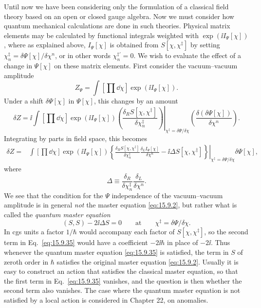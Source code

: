Until now we have been considering only the formulation of a classical field
theory based on an open or closed gauge algebra. Now we must consider how
quantum mechanical calculations are done in such theories. Physical matrix
elements may be calculated by functional integrals weighted with
$\exp(\ii I_\Psi[\chi])$, where as explained above, $I_\Psi[\chi]$ is obtained
from $S[\chi,\chi^{\ddagger}]$ by setting
$\chi_n^{\ddagger}=\delta\Psi[\chi]/\delta\chi^n$, or in other words
$\chi_n^{\ddagger\prime}=0$. We wish to evaluate the effect of a change in
$\Psi[\chi]$ on these matrix elements. First consider the vacuum--vacuum
amplitude
\begin{equation}
Z_\Psi=\int\left[\prod \dd\chi\right]\exp(\ii I_\Psi[\chi]).
\tag{15.9.31}\label{eq:15.9.31}
\end{equation}
Under a shift $\delta\Psi[\chi]$ in $\Psi[\chi]$, this changes by an amount
\begin{equation}
\delta Z=\ii\int\left[\prod \dd\chi\right]\exp(\ii I_\Psi[\chi])
\left.
\left(\frac{\delta_R S[\chi,\chi^{\ddagger}]}
{\delta\chi_n^{\ddagger}}\right)
\right|_{\chi^{\ddagger}=\delta\Psi/\delta\chi}
\left(\frac{\delta(\delta\Psi[\chi])}{\delta\chi^n}\right).
\tag{15.9.32}\label{eq:15.9.32}
\end{equation}
Integrating by parts in field space, this becomes
\begin{align}
\delta Z={}&\int\left[\prod \dd\chi\right]\exp(\ii I_\Psi[\chi])
\left.
\left\{
\frac{\delta_R S[\chi,\chi^{\ddagger}]}
{\delta\chi_n^{\ddagger}}
\frac{\delta_L I_\Psi[\chi]}{\delta\chi^n}
-\ii\Delta S[\chi,\chi^{\ddagger}]
\right\}\right|_{\chi^{\ddagger}=\delta\Psi/\delta\chi}
\delta\Psi[\chi],
\tag{15.9.33}\label{eq:15.9.33}
\end{align}
where
\begin{equation}
\Delta\equiv
\frac{\delta_R}{\delta\chi_n^{\ddagger}}
\frac{\delta_L}{\delta\chi^n}.
\tag{15.9.34}\label{eq:15.9.34}
\end{equation}
We see that the condition for the $\Psi$ independence of the vacuum--vacuum
amplitude is in general \emph{not} the master equation \eqref{eq:15.9.2}, but
rather what is called the \emph{quantum master equation}
\begin{equation}
(S,S)-2\ii\Delta S=0
\qquad\text{at}\qquad
\chi^{\ddagger}=\delta\Psi/\delta\chi.
\tag{15.9.35}\label{eq:15.9.35}
\end{equation}
In cgs units a factor $1/\hbar$ would accompany each factor of
$S[\chi,\chi^{\ddagger}]$, so the second term in Eq.~\eqref{eq:15.9.35} would
have a coefficient $-2\ii\hbar$ in place of $-2\ii$. Thus whenever the quantum
master equation \eqref{eq:15.9.35} is satisfied, the term in $S$ of zeroth
order in $\hbar$ satisfies the original master equation \eqref{eq:15.9.2}.
Usually it is easy to construct an action that satisfies the classical master
equation, so that the first term in Eq.~\eqref{eq:15.9.35} vanishes, and the
question is then whether the second term also vanishes. The case where the
quantum master equation is not satisfied by a local action is considered in
Chapter 22, on anomalies.

